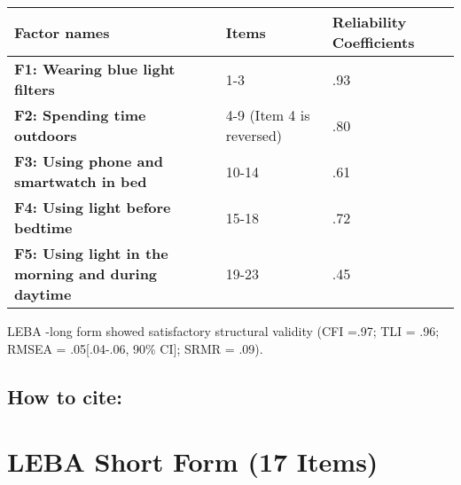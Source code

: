 \begin{appendix}
\begin{longtable}[]{@{}lll@{}}
\toprule
Factor names & Items & Reliability Coefficients \\
\midrule
\endhead
\textbf{F1: Wearing blue light filters} & 1-3 & .93 \\
\textbf{F2: Spending time outdoors} & 4-9 (Item 4 is reversed) & .80 \\
\textbf{F3: Using phone and smartwatch in bed} & 10-14 & .61 \\
\textbf{F4: Using light before bedtime} & 15-18 & .72 \\
\textbf{F5: Using light in the morning and during daytime} & 19-23 &
.45 \\
\bottomrule
\end{longtable}

LEBA -long form showed satisfactory structural validity (CFI =.97; TLI =
.96; RMSEA = .05{[}.04-.06, 90\% CI{]}; SRMR = .09).

\hypertarget{how-to-cite}{%
\subsection{How to cite:}\label{how-to-cite}}

\elandscape

\newpage

\blandscape

\hypertarget{leba-short-form-17-items}{%
\section{LEBA Short Form (17 Items)}\label{leba-short-form-17-items}}


\end{appendix}

